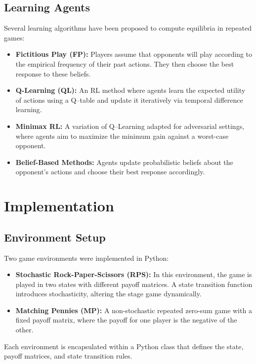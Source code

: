 \documentclass[11pt]{article}
\begin{document}
\subsection{Learning Agents}
Several learning algorithms have been proposed to compute equilibria in repeated games:
\begin{itemize}
    \item \textbf{Fictitious Play (FP):} Players assume that opponents will play according to the empirical frequency of their past actions. They then choose the best response to these beliefs.
    \item \textbf{Q-Learning (QL):} An RL method where agents learn the expected utility of actions using a Q–table and update it iteratively via temporal difference learning.
    \item \textbf{Minimax RL:} A variation of Q–Learning adapted for adversarial settings, where agents aim to maximize the minimum gain against a worst-case opponent.
    \item \textbf{Belief-Based Methods:} Agents update probabilistic beliefs about the opponent's actions and choose their best response accordingly.
\end{itemize}

\section{Implementation}

\subsection{Environment Setup}
Two game environments were implemented in Python:
\begin{itemize}
    \item \textbf{Stochastic Rock-Paper-Scissors (RPS):} In this environment, the game is played in two states with different payoff matrices. A state transition function introduces stochasticity, altering the stage game dynamically.
    \item \textbf{Matching Pennies (MP):} A non-stochastic repeated zero-sum game with a fixed payoff matrix, where the payoff for one player is the negative of the other.
\end{itemize}
Each environment is encapsulated within a Python class that defines the state, payoff matrices, and state transition rules.
\end{document}
